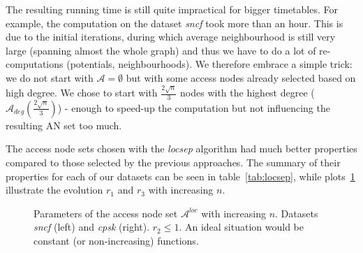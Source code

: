 		The resulting running time is still quite impractical for bigger timetables. For example, the computation on the dataset \textit{sncf} took more than an hour. This is due to the initial iterations, during which average neighbourhood is still very large (spanning almost the whole graph) and thus we have to do a lot of re-computations (potentials, neighbourhoods). We therefore embrace a simple trick: we do not start with $\mathcal{A} = \emptyset$ but with some access nodes already selected based on high degree. We chose to start with $\frac{2 \sqrt{n}}{3}$ nodes with the highest degree ($\mathcal{A}_{deg}(\frac{2 \sqrt{n}}{3})$) - enough to speed-up the computation but not influencing the resulting AN set too much. 
		
		The access node sets chosen with the \textit{locsep} algorithm had much better properties compared to those selected by the previous approaches. The summary of their properties for each of our datasets can be seen in table~\ref{tab:locsep}, while plots~\ref{plot:locsep-size} illustrate the evolution $r_{1}$ and $r_{3}$ with increasing $n$. \\
		
		\begin{figure}[h!]
		\centering
	    \caption{\label{plot:locsep-size} Parameters of the access node set $\mathcal{A}^{loc}$ with increasing $n$. Datasets \textit{sncf} (left) and \textit{cpsk} (right). $r_{2} \leq 1$. An ideal situation would be constant (or non-increasing) functions.}
		\end{figure}	
		
